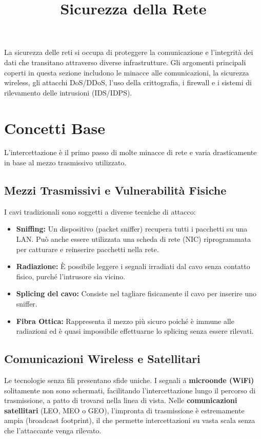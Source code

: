 \documentclass{article}
\title{Sicurezza della Rete}
\author{}
\date{}
\begin{document}
\maketitle

La sicurezza delle reti si occupa di proteggere la comunicazione e l'integrità dei dati che transitano attraverso diverse infrastrutture. Gli argomenti principali coperti in questa sezione includono le minacce alle comunicazioni, la sicurezza wireless, gli attacchi DoS/DDoS, l'uso della crittografia, i firewall e i sistemi di rilevamento delle intrusioni (IDS/IDPS).

\section*{Concetti Base}

L'intercettazione è il primo passo di molte minacce di rete e varia drasticamente in base al mezzo trasmissivo utilizzato.

\subsection*{Mezzi Trasmissivi e Vulnerabilità Fisiche}

I cavi tradizionali sono soggetti a diverse tecniche di attacco:

\begin{itemize}
    \item \textbf{Sniffing:} Un dispositivo (packet sniffer) recupera tutti i pacchetti su una LAN. Può anche essere utilizzata una scheda di rete (NIC) riprogrammata per catturare e reinserire pacchetti nella rete.
    \item \textbf{Radiazione:} È possibile leggere i segnali irradiati dal cavo senza contatto fisico, purché l'intrusore sia vicino.
    \item \textbf{Splicing del cavo:} Consiste nel tagliare fisicamente il cavo per inserire uno sniffer.
    \item \textbf{Fibra Ottica:} Rappresenta il mezzo più sicuro poiché è immune alle radiazioni ed è quasi impossibile effettuarne lo splicing senza essere rilevati.
\end{itemize}

\subsection*{Comunicazioni Wireless e Satellitari}

Le tecnologie senza fili presentano sfide uniche. I segnali a \textbf{microonde (WiFi)} solitamente non sono schermati, facilitando l'intercettazione lungo il percorso di trasmissione, a patto di trovarsi nella linea di vista. Nelle \textbf{comunicazioni satellitari} (LEO, MEO o GEO), l'impronta di trasmissione è estremamente ampia (broadcast footprint), il che permette intercettazioni su vasta scala senza che l'attaccante venga rilevato.
\end{document}
